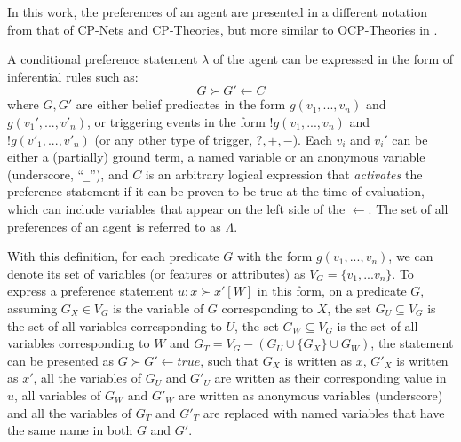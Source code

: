 In this work, the preferences of an agent are presented in a different notation from that of CP-Nets and CP-Theories, but more similar to OCP-Theories in \cite{DiNoia2015}.

A conditional preference statement $\lambda$ of the agent can be expressed in the form of inferential rules such as:
\begin{equation*}
    G \succ G' \leftarrow C
\end{equation*}
where $G,G'$ are either belief predicates in the form $g(v_1,...,v_n)$ and $g({v}_1',...,{v}'_n)$, or triggering events in the form $!g(v_1,...,v_n)$ and $!g({v}'_1,...,{v}'_n)$ (or any other type of trigger, $?,+,-$). Each $v_i$ and ${v}_i'$ can be either a (partially) ground term, a named variable or an anonymous variable (underscore, ``\texttt{\_}''), and $C$ is an arbitrary logical expression that \textit{activates} the preference statement if it can be proven to be true at the time of evaluation, which can include variables that appear on the left side of the $\leftarrow$. The set of all preferences of an agent is referred to as $\Lambda$.

With this definition, for each predicate $G$ with the form $g(v_1,...,v_n)$, we can denote its set of variables (or features or attributes) as $V_G = \{v_1,...v_n\}$. %
To express a preference statement $u : x \succ x' [W]$ in this form, on a predicate $G$, assuming $G_X \in V_G$ is the variable of $G$ corresponding to $X$, the set $G_U \subseteq V_G$ is the set of all variables corresponding to $U$, the set $G_W \subseteq V_G$ is the set of all variables corresponding to $W$ and $G_T = V_G - (G_U \cup \{G_X\} \cup G_W)$, the statement can be presented as $G \succ G' \leftarrow true$, such that $G_X$ is written as $x$, $G'_X$ is written as $x'$, all the variables of $G_U$ and $G'_U$ are written as their corresponding value in $u$, all variables of $G_W$ and $G'_W$ are written as anonymous variables (underscore) and all the variables of $G_T$ and $G'_T$ are replaced with named variables that have the same name in both $G$ and $G'$.


